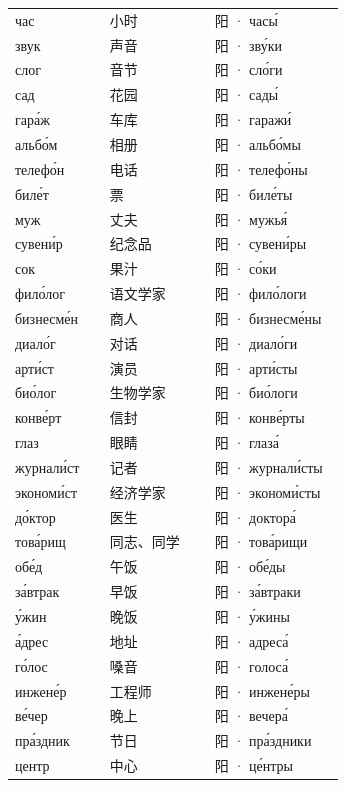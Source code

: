 \documentclass[11pt]{ctexart}
\begin{document}
\begin{longtable}{@{}p{0.27\linewidth}p{0.30\linewidth}p{0.37\linewidth}@{}}
час & 小时 & 阳 · часы́ \\
звук & 声音 & 阳 · зву́ки \\
слог & 音节 & 阳 · сло́ги \\
сад & 花园 & 阳 · сады́ \\
гара́ж & 车库 & 阳 · гаражи́ \\
альбо́м & 相册 & 阳 · альбо́мы \\
телефо́н & 电话 & 阳 · телефо́ны \\
биле́т & 票 & 阳 · биле́ты \\
муж & 丈夫 & 阳 · мужья́ \\
сувени́р & 纪念品 & 阳 · сувени́ры \\
сок & 果汁 & 阳 · со́ки \\
фило́лог & 语文学家 & 阳 · фило́логи \\
бизнесме́н & 商人 & 阳 · бизнесме́ны \\
диало́г & 对话 & 阳 · диало́ги \\
арти́ст & 演员 & 阳 · арти́сты \\
био́лог & 生物学家 & 阳 · био́логи \\
конве́рт & 信封 & 阳 · конве́рты \\
глаз & 眼睛 & 阳 · глаза́ \\
журнали́ст & 记者 & 阳 · журнали́сты \\
экономи́ст & 经济学家 & 阳 · экономи́сты \\
до́ктор & 医生 & 阳 · доктора́ \\
това́рищ & 同志、同学 & 阳 · това́рищи \\
обе́д & 午饭 & 阳 · обе́ды \\
за́втрак & 早饭 & 阳 · за́втраки \\
у́жин & 晚饭 & 阳 · у́жины \\
а́дрес & 地址 & 阳 · адреса́ \\
го́лос & 嗓音 & 阳 · голоса́ \\
инжене́р & 工程师 & 阳 · инжене́ры \\
ве́чер & 晚上 & 阳 · вечера́ \\
пра́здник & 节日 & 阳 · пра́здники \\
центр & 中心 & 阳 · це́нтры \\
\hline
\end{longtable}
\end{document}
